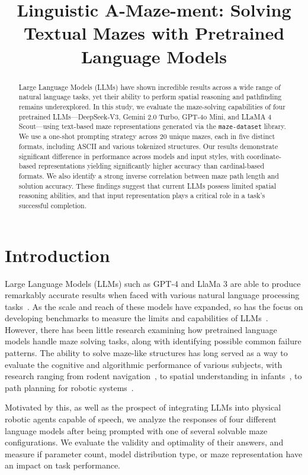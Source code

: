 \documentclass[conference]{IEEEtran}
\title{Linguistic A-Maze-ment: Solving Textual Mazes with Pretrained Language Models}
\author{\IEEEauthorblockN{Gabriel Del Castillo\IEEEauthorrefmark{1}, Nate Webster\IEEEauthorrefmark{2}}
\IEEEauthorblockA{\textit{Department of Computer Science} \\
\textit{Colorado School of Mines}\\
Golden, CO, USA \\
\IEEEauthorrefmark{1}gdelcastillo@mines.edu,
\IEEEauthorrefmark{2}nwebster@mines.edu
}
}
\begin{document}
\maketitle

\begin{abstract}
  Large Language Models (LLMs) have shown incredible results across a wide range of natural language tasks, yet their ability to perform spatial reasoning and pathfinding remains underexplored. In this study, we evaluate the maze-solving capabilities of four pretrained LLMs—DeepSeek-V3, Gemini 2.0 Turbo, GPT-4o Mini, and LLaMA 4 Scout—using text-based maze representations generated via the \texttt{maze-dataset} library. We use a one-shot prompting strategy across 20 unique mazes, each in five distinct formats, including ASCII and various tokenized structures. Our results demonstrate significant difference in performance across models and input styles, with coordinate-based representations yielding significantly higher accuracy than cardinal-based formats. We also identify a strong inverse correlation between maze path length and solution accuracy. These findings suggest that current LLMs possess limited spatial reasoning abilities, and that input representation plays a critical role in a task's successful completion.
  
\end{abstract}

\section{Introduction}

Large Language Models (LLMs) such as GPT-4 and LlaMa 3 are able to produce remarkably accurate results when faced with various natural language processing tasks~\cite{openai}. As the scale and reach of these models have expanded, so has the focus on developing benchmarks to measure the limits and capabilities of LLMs~\cite{srivastava, liang}. However, there has been little research examining how pretrained language models handle maze solving tasks, along with identifying possible common failure patterns. The ability to solve maze-like structures has long served as a way to evaluate the cognitive and algorithmic performance of various subjects, with research ranging from rodent navigation~\cite{tolman}, to spatial understanding in infants~\cite{piaget}, to path planning for robotic systems~\cite{stentz}.

Motivated by this, as well as the prospect of integrating LLMs into physical robotic agents capable of speech, we analyze the responses of four different language models after being prompted with one of several solvable maze configurations. We evaluate the validity and optimality of their answers, and measure if parameter count, model distribution type, or maze representation have an impact on task performance.
\end{document}
